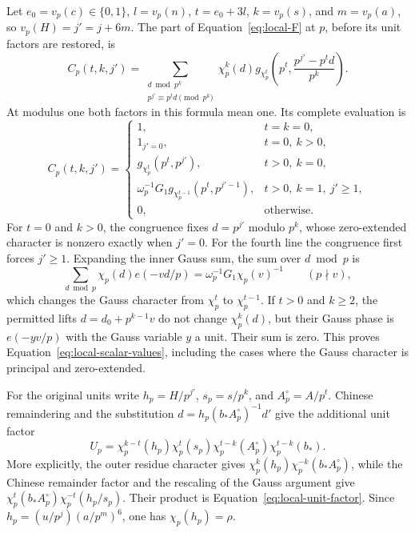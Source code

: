 \documentclass[12pt]{article}
\begin{document}
Let $e_0=v_p(c)\in\{0,1\}$, $l=v_p(n)$, $t=e_0+3l$,
$k=v_p(s)$, and $m=v_p(a)$, so $v_p(H)=j'=j+6m$.
The part of Equation~\eqref{eq:local-F} at $p$, before its unit
factors are restored, is
\begin{equation}\label{eq:local-scalar-definition}
 C_p(t,k,j')=
 \sum_{\substack{d\bmod p^k\\p^{j'}\equiv p^td\pmod{p^k}}}
 \chi_p^k(d)
 g_{\chi_p^t}\!\left(p^t,\frac{p^{j'}-p^td}{p^k}\right).
\end{equation}
At modulus one both factors in this formula mean one.  Its complete
evaluation is
\begin{equation}\label{eq:local-scalar-values}
 C_p(t,k,j')=
 \begin{cases}
 1,&t=k=0,\\
 1_{j'=0},&t=0,\ k>0,\\
 g_{\chi_p^t}(p^t,p^{j'}),&t>0,\ k=0,\\
 \omega_p^{-1}G_1g_{\chi_p^{t-1}}(p^t,p^{j'-1}),
                      &t>0,\ k=1,\ j'\ge1,\\
 0,&\text{otherwise}.
 \end{cases}
\end{equation}
For $t=0$ and $k>0$, the congruence fixes $d=p^{j'}$ modulo
$p^k$, whose zero-extended character is nonzero exactly when
$j'=0$.  For the fourth line the congruence first forces $j'\ge1$.
Expanding the inner Gauss sum, the sum over $d\bmod p$ is
\[
 \sum_{d\bmod p}\chi_p(d)e(-vd/p)
       =\omega_p^{-1}G_1\chi_p(v)^{-1}
       \qquad(p\nmid v),
\]
which changes the Gauss character from $\chi_p^t$ to
$\chi_p^{t-1}$.  If $t>0$ and $k\ge2$, the permitted lifts
$d=d_0+p^{k-1}v$ do not change $\chi_p^k(d)$, but their Gauss phase
is $e(-yv/p)$ with the Gauss variable $y$ a unit.  Their sum is
zero.  This proves Equation~\eqref{eq:local-scalar-values}, including
the cases where the Gauss character is principal and zero-extended.

For the original units write $h_p=H/p^{j'}$, $s_p=s/p^k$, and
$A_p^\circ=A/p^t$.  Chinese remaindering and the substitution
$d=h_p(b_*A_p^\circ)^{-1}d'$ give the additional unit factor
\begin{equation}\label{eq:local-unit-factor}
 U_p=\chi_p^{k-t}(h_p)\chi_p^t(s_p)
       \chi_p^{t-k}(A_p^\circ)\chi_p^{t-k}(b_*).
\end{equation}
More explicitly, the outer residue character gives
$\chi_p^k(h_p)\chi_p^{-k}(b_*A_p^\circ)$, while the Chinese
remainder factor and the rescaling of the Gauss argument give
$\chi_p^t(b_*A_p^\circ)\chi_p^{-t}(h_p/s_p)$.  Their product is
Equation~\eqref{eq:local-unit-factor}.  Since
$h_p=(u/p^j)(a/p^m)^6$, one has $\chi_p(h_p)=\rho$.
\end{document}
